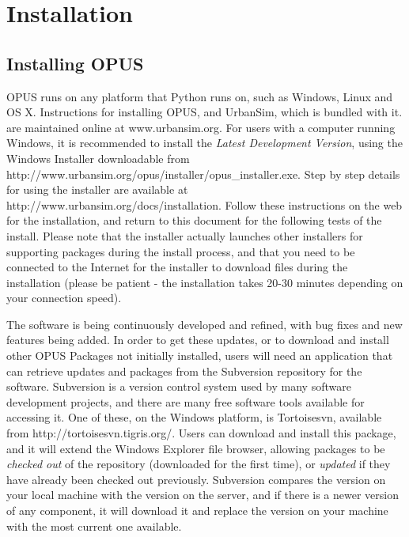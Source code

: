 
\chapter{Installation}
\label{chapter:installation}


\section{Installing OPUS}
OPUS runs on any platform that Python runs on, such as Windows, Linux and OS X.  Instructions for installing OPUS, and UrbanSim, which is bundled with it. are maintained online at www.urbansim.org.  For users with a computer running Windows, it is recommended to install the \emph{Latest Development Version}, using the Windows Installer downloadable from http://www.urbansim.org/opus/installer/opus\_installer.exe.  Step by step details for using the installer are available at http://www.urbansim.org/docs/installation.  Follow these instructions on the web for the installation, and return to this document for the following tests of the install.  Please note that the installer actually launches other installers for supporting packages during the install process, and that you need to be connected to the Internet for the installer to download files during the installation (please be patient - the installation takes 20-30 minutes depending on your connection speed).

The software is being continuously developed and refined, with bug fixes and new features being added.  In order to get these updates, or to download and install other OPUS Packages not initially installed, users will need an application that can retrieve updates and packages from the Subversion repository for the software.  Subversion is a version control system used by many software development projects, and there are many free software tools available for accessing it.  One of these, on the Windows platform, is Tortoisesvn, available from http://tortoisesvn.tigris.org/.  Users can download and install this package, and it will extend the Windows Explorer file browser, allowing packages to be \emph{checked out} of the repository (downloaded for the first time), or \emph{updated} if they have already been checked out previously.  Subversion compares the version on your local machine with the version on the server, and if there is a newer version of any component, it will download it and replace the version on your machine with the most current one available.


